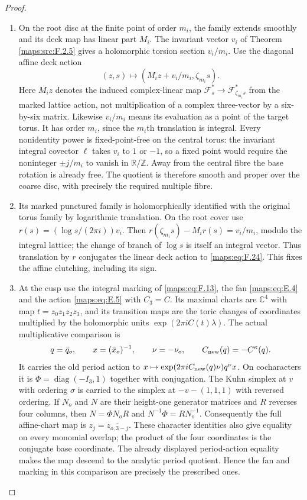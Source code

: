 \documentclass[11pt,a4paper]{article}
\theoremstyle{definition}
\begin{document}
\begin{proof}
\begin{enumerate}[label=\arabic*.]
\item On the root disc at the finite point of order $m_i$, the family
extends smoothly and its deck map has linear part $M_i$.
The invariant vector $v_i$ of Theorem \ref{maps:src:F.2.5} gives a holomorphic
torsion section $v_i/m_i$.  Use the diagonal affine deck action
\[
 (z,s)\longmapsto(M_i z+v_i/m_i,\zeta_{m_i}s).
 \tag{F.24}\label{maps:eq:F.24}
\]
Here $M_i z$ denotes the induced complex-linear map
$\mathcal F_s^*\to\mathcal F_{\zeta_{m_i}s}^*$ from the marked
lattice action, not multiplication of a complex three-vector
by a six-by-six matrix.  Likewise $v_i/m_i$ means its evaluation
as a point of the target torus.
It has order $m_i$, since the $m_i$th translation is integral.
Every nonidentity power is fixed-point-free on the central
torus: the invariant integral covector $\ell$ takes $v_i$ to
$1$ or $-1$, so a fixed point would require the noninteger
$\pm j/m_i$ to vanish in $\mathbb R/\mathbb Z$.
Away from the central fibre the base rotation is already free.
The quotient is therefore smooth and proper over the coarse
disc, with precisely the required multiple fibre.

\item Its marked punctured family is holomorphically identified with
the original torus family by logarithmic translation.  On the
root cover use $r(s)=(\log s/(2\pi i))v_i$.  Then
$r(\zeta_{m_i}s)-M_i r(s)=v_i/m_i$, modulo the integral lattice;
the change of branch of $\log s$ is itself an integral vector.
Thus translation by $r$ conjugates the linear deck action to
\eqref{maps:eq:F.24}.  This fixes the affine clutching, including its sign.

\item At the cusp use the integral marking of \eqref{maps:eq:F.13}, the fan \eqref{maps:eq:E.4}
and the action \eqref{maps:eq:E.5} with $C_3=C$.
Its maximal charts are $\mathbb C^4$ with map
$t=z_0z_1z_2z_3$, and its transition maps are the toric changes
of coordinates multiplied by the holomorphic units
$\exp(2\pi i C(t)\lambda)$.
The actual multiplicative comparison is
\[
 q=\bar q_o,\qquad x=(\bar x_o)^{-1},\qquad
 \nu=-\nu_o,
 \qquad C_{\rm new}(q)=-C^\kappa(q).
\]
It carries the old period action to
$x\mapsto\exp(2\pi iC_{\rm new}(q)\nu)q^\nu x$.
On cocharacters it is
$\Phi=\operatorname{diag}(-I_3,1)$ together with conjugation.
The Kuhn simplex at $v$ with ordering $\sigma$ is carried to
the simplex at $-v-(1,1,1)$ with reversed ordering.
If $N_o$ and $N$ are their height-one generator matrices and
$R$ reverses four columns, then
$N=\Phi N_oR$ and $N^{-1}\Phi=RN_o^{-1}$.
Consequently the full affine-chart map is
$z_j=\overline{z_{o,3-j}}$.  These character identities also
give equality on every monomial overlap; the product of the
four coordinates is the conjugate base coordinate.
The already displayed period-action equality makes the map
descend to the analytic period quotient.  Hence the fan and
marking in this comparison are precisely the prescribed ones.


\end{enumerate}
\end{proof}
\end{document}
